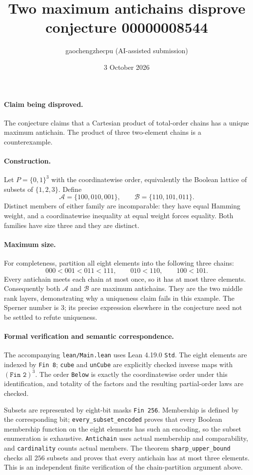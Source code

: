 \documentclass[10pt]{article}
\title{Two maximum antichains disprove conjecture 00000008544}
\author{gaochengzhecpu (AI-assisted submission)}
\date{3 October 2026}
\makeatletter
\renewcommand{\maketitle}{\begin{center}
{\Large\bfseries\@title\par}\vspace{0.6em}
{\small\@author\par\@date}
\end{center}\vspace{0.5em}}
\makeatother
\begin{document}
\maketitle
\paragraph{Claim being disproved.}
The conjecture claims that a Cartesian product of total-order chains has a unique maximum antichain. The product of three two-element chains is a counterexample.
\paragraph{Construction.}
Let $P=\{0,1\}^3$ with the coordinatewise order, equivalently the Boolean lattice of subsets of $\{1,2,3\}$. Define
\[
 \mathcal A=\{100,010,001\},\qquad
 \mathcal B=\{110,101,011\}.
\]
Distinct members of either family are incomparable: they have equal Hamming weight, and a coordinatewise inequality at equal weight forces equality. Both families have size three and they are distinct.
\paragraph{Maximum size.}
For completeness, partition all eight elements into the following three chains:
\[
 000<001<011<111,\qquad 010<110,\qquad 100<101.
\]
Every antichain meets each chain at most once, so it has at most three elements. Consequently both $\mathcal A$ and $\mathcal B$ are maximum antichains. They are the two middle rank layers, demonstrating why a uniqueness claim fails in this example. The Sperner number is $3$; its precise expression elsewhere in the conjecture need not be settled to refute uniqueness.
\paragraph{Formal verification and semantic correspondence.}
The accompanying \texttt{lean/Main.lean} uses Lean 4.19.0 \texttt{Std}. The eight elements are indexed by \texttt{Fin 8}; \texttt{cube} and \texttt{unCube} are explicitly checked inverse maps with $(\texttt{Fin 2})^3$. The order \texttt{Below} is exactly the coordinatewise order under this identification, and totality of the factors and the resulting partial-order laws are checked.

Subsets are represented by eight-bit masks \texttt{Fin 256}. Membership is defined by the corresponding bit; \texttt{every\_subset\_encoded} proves that every Boolean membership function on the eight elements has such an encoding, so the subset enumeration is exhaustive. \texttt{Antichain} uses actual membership and comparability, and \texttt{cardinality} counts actual members. The theorem \texttt{sharp\_upper\_bound} checks all $256$ subsets and proves that every antichain has at most three elements. This is an independent finite verification of the chain-partition argument above.
\end{document}
